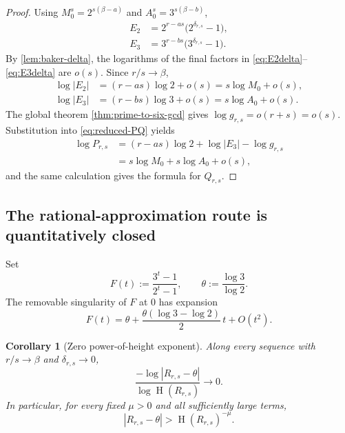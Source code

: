 \documentclass[11pt,oneside]{article}
\newtheorem{corollary}[theorem]{Corollary}
\theoremstyle{definition}
\newcommand{\height}{\operatorname{H}}
\begin{document}
\begin{proof}
Using $M_0^s=2^{s(\beta-a)}$ and $A_0^s=3^{s(\beta-b)}$,
\begin{align}
  E_2&=2^{r-as}\bigl(2^{\delta_{r,s}}-1\bigr),
  \label{eq:E2delta}\\
  E_3&=3^{r-bs}\bigl(3^{\delta_{r,s}}-1\bigr).
  \label{eq:E3delta}
\end{align}
By \cref{lem:baker-delta}, the logarithms of the final factors in
\eqref{eq:E2delta}--\eqref{eq:E3delta} are $o(s)$.  Since $r/s\to\beta$,
\begin{align}
  \log|E_2|
   &=(r-as)\log2+o(s)
    =s\log M_0+o(s),\label{eq:E2height}\\
  \log|E_3|
   &=(r-bs)\log3+o(s)
    =s\log A_0+o(s).\label{eq:E3height}
\end{align}
The global theorem \cref{thm:prime-to-six-gcd} gives
$\log g_{r,s}=o(r+s)=o(s)$.  Substitution into
\eqref{eq:reduced-PQ} yields
\begin{align*}
 \log P_{r,s}
 &= (r-as)\log2+\log|E_3|-\log g_{r,s}\\
 &=s\log M_0+s\log A_0+o(s),
\end{align*}
and the same calculation gives the formula for $Q_{r,s}$.
\end{proof}

\subsection{The rational-approximation route is quantitatively closed}

Set
\begin{equation}\label{eq:Fdelta}
  F(t):=\frac{3^t-1}{2^t-1},
  \qquad
  \theta:=\frac{\log3}{\log2}.
\end{equation}
The removable singularity of $F$ at $0$ has expansion
\begin{equation}\label{eq:Fexpansion}
  F(t)
  =\theta+\frac{\theta(\log3-\log2)}{2}\,t+O(t^2).
\end{equation}

\begin{corollary}[Zero power-of-height exponent]\label{cor:zero-exponent}
Along every sequence with $r/s\to\beta$ and $\delta_{r,s}\to0$,
\begin{equation}\label{eq:zero-exponent}
  \frac{-\log|R_{r,s}-\theta|}{\log\height(R_{r,s})}
  \longrightarrow0.
\end{equation}
In particular, for every fixed $\mu>0$ and all sufficiently large terms,
\begin{equation}\label{eq:no-height-power}
  |R_{r,s}-\theta|>\height(R_{r,s})^{-\mu}.
\end{equation}
\end{corollary}
\end{document}
